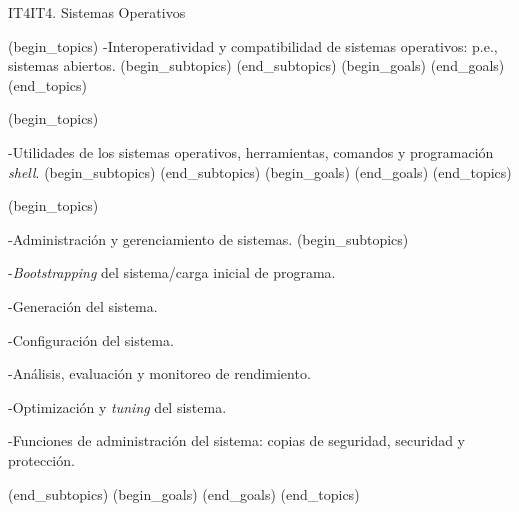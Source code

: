\begin{BKL2}{IT4}{IT4. Sistemas Operativos}
 

(begin_topics)
-Interoperatividad y compatibilidad de sistemas operativos: p.e., sistemas abiertos.
(begin_subtopics)
(end_subtopics)
(begin_goals)
(end_goals)
(end_topics)

 

(begin_topics)

-Utilidades de los sistemas operativos, herramientas, comandos y programación {\it shell}.
(begin_subtopics)
(end_subtopics)
(begin_goals)
(end_goals)
(end_topics)

 

(begin_topics)

-Administración y gerenciamiento de sistemas.
(begin_subtopics)

-{\it Bootstrapping} del sistema/carga inicial de programa.

-Generación del sistema.

-Configuración del sistema.

-Análisis, evaluación y monitoreo de rendimiento.

-Optimización y {\it tuning} del sistema.

-Funciones de administración del sistema: copias de seguridad, securidad y protección.

(end_subtopics)
(begin_goals)
(end_goals)
(end_topics)

\end{BKL2}
 


